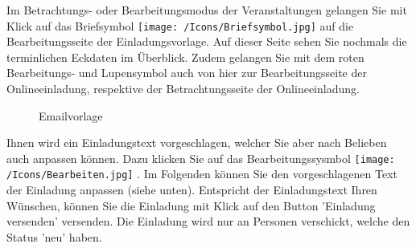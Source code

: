 Im Betrachtungs- oder Bearbeitungsmodus der Veranstaltungen gelangen Sie mit Klick auf das Briefsymbol \texttt{[image: /Icons/Briefsymbol.jpg]} auf die Bearbeitungsseite der Einladungsvorlage. Auf dieser Seite sehen Sie nochmals die terminlichen Eckdaten im Überblick. Zudem gelangen Sie mit dem roten Bearbeitungs- und Lupensymbol  auch von hier zur Bearbeitungsseite der Onlineeinladung, respektive der Betrachtungsseite der Onlineeinladung. \\

\begin{figure}[H]
\caption{Emailvorlage}
\end{figure}

Ihnen wird ein Einladungstext vorgeschlagen, welcher Sie aber nach Belieben auch anpassen können. Dazu klicken Sie auf das Bearbeitungssysmbol \texttt{[image: /Icons/Bearbeiten.jpg]} . Im Folgenden können Sie den vorgeschlagenen Text der Einladung anpassen (siehe unten). Entspricht der Einladungstext Ihren Wünschen, können Sie die Einladung mit Klick auf den Button 'Einladung versenden'  versenden. Die Einladung wird nur an Personen verschickt, welche den Status 'neu' haben.

